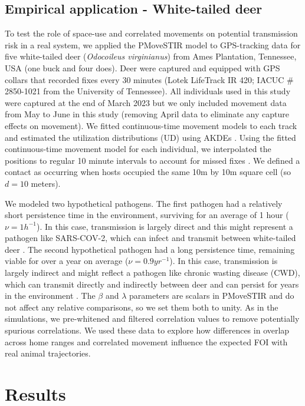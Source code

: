 \documentclass[letterpaper]{article}
\begin{document}
\subsection*{Empirical application - White-tailed deer}

To test the role of space-use and correlated movements on potential transmission risk in a real system, we applied the PMoveSTIR model to GPS-tracking data for five white-tailed deer (\emph{Odocoileus virginianus}) from Ames Plantation, Tennessee, USA (one buck and four does). 
Deer were captured and equipped with GPS collars that recorded fixes every 30 minutes (Lotek LifeTrack IR 420; IACUC \# 2850-1021 from the University of Tennessee).  All individuals used in this study were captured at the end of March 2023 but we only included movement data from May to June in this study (removing April data to eliminate any capture effects on movement).  We fitted continuous-time movement models to each track and estimated the utilization distributions (UD) using AKDEs \citep{Calabrese2016}. Using the fitted continuous-time movement model for each individual, we interpolated the positions to regular 10 minute intervals to account for missed fixes \citep{Yang2023}.  We defined a contact as occurring when hosts occupied the same 10m by 10m square cell (so $d = 10$ meters). 

We modeled two hypothetical pathogens. The first pathogen had a relatively short persistence time in the environment, surviving for an average of 1 hour  ($\nu=1 h^{-1}$). In this case, transmission is largely direct and this might represent a pathogen like SARS-COV-2, which can infect and transmit between white-tailed deer \citep{Hale2022}. The second hypothetical pathogen had a long persistence time, remaining viable for over a year on average ($\nu=0.9 yr^{-1}$). In this case, transmission is largely indirect and might reflect a pathogen like chronic wasting disease (CWD), which can transmit directly and indirectly between deer and can persist for years in the environment \citep{Saunders2012a}. The $\beta$ and $\lambda$ parameters are scalars in PMoveSTIR and do not affect any relative comparisons, so we set them both to unity. As in the simulations, we pre-whitened and filtered correlation values to remove potentially spurious correlations. 
We used these data to explore how differences in overlap across home ranges and correlated movement influence the expected FOI with real animal trajectories.

\section*{Results}
\end{document}
